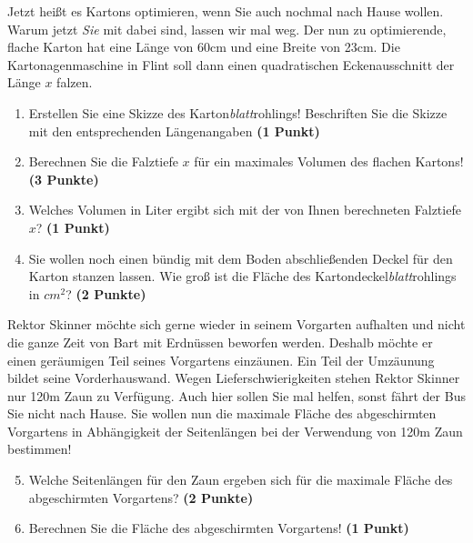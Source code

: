 \documentclass[a4paper, 9pt]{scrartcl}\usepackage[]{graphicx}\usepackage[]{xcolor}
\begin{document}
Jetzt heißt es Kartons optimieren, wenn Sie auch nochmal nach Hause wollen. Warum jetzt \textit{Sie} mit dabei sind, lassen wir mal weg. Der nun zu optimierende, flache Karton hat eine Länge von 60cm und eine Breite von 23cm. Die Kartonagenmaschine in Flint soll dann einen quadratischen Eckenausschnitt der Länge $x$ falzen.

\begin{enumerate}
\item Erstellen Sie eine Skizze des Karton\textit{blatt}rohlings! Beschriften Sie die Skizze mit den entsprechenden Längenangaben \textbf{(1 Punkt)}
\item Berechnen Sie die Falztiefe $x$ für ein maximales Volumen des flachen Kartons! \textbf{(3 Punkte)}
\item Welches Volumen in Liter ergibt sich mit der von Ihnen berechneten Falztiefe $x$?  \textbf{(1 Punkt)}
\item Sie wollen noch einen bündig mit dem Boden abschließenden Deckel für den Karton stanzen lassen. Wie groß ist die Fläche des Kartondeckel\textit{blatt}rohlings in $cm^2$? \textbf{(2 Punkte)}
\end{enumerate}

Rektor Skinner möchte sich gerne wieder in seinem Vorgarten aufhalten und nicht die ganze Zeit von Bart mit Erdnüssen beworfen werden. Deshalb möchte er einen geräumigen Teil seines Vorgartens einzäunen. Ein Teil der Umzäunung bildet seine Vorderhauswand. Wegen Lieferschwierigkeiten stehen Rektor Skinner nur 120m Zaun zu Verfügung. Auch hier sollen Sie mal helfen, sonst fährt der Bus Sie nicht nach Hause. Sie wollen nun die maximale Fläche des abgeschirmten Vorgartens in Abhängigkeit der Seitenlängen bei der Verwendung von 120m Zaun bestimmen!

\begin{enumerate}
  \setcounter{enumi}{4}  
\item  Welche Seitenlängen für den Zaun ergeben sich für die maximale Fläche des abgeschirmten Vorgartens? \textbf{(2 Punkte)}
\item Berechnen Sie die Fläche des abgeschirmten Vorgartens! \textbf{(1 Punkt)}
\end{enumerate}

 
\clearpage
\end{document}
